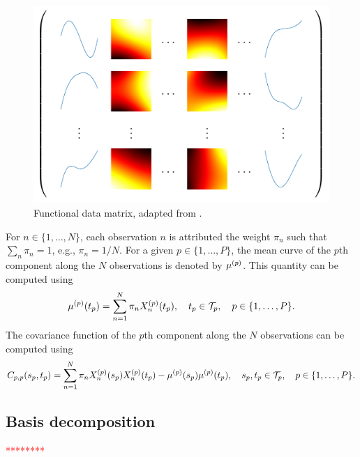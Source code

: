 \begin{figure}
    \centering
    \includegraphics[]{figures/data_matrix.pdf}
    \caption{Functional data matrix, adapted from \cite{berrenderoPrincipalComponentsMultivariate2011}.}
    \label{fig:data_matrix}
\end{figure}

For $n \in \{1, \dots, N\}$, each observation $n$ is attributed the weight $\pi_n$ such that $\sum_n \pi_n = 1$, e.g., $\pi_n = 1/N$.
For a given $p \in \{1, \dots, P\}$, the mean curve of the $p$th component along the $N$ observations is denoted by $\mu^{(p)}$. This quantity can be computed using 
\begin{equation*}\label{eq:mu_estimation}
    \mu^{(p)}(t_p) = \sum_{n = 1}^N \pi_nX_n^{(p)}(t_p), \quad t_p \in \mathcal{T}_{p}, \quad p \in \{1, \dots, P\}.
\end{equation*}
The covariance function of the $p$th component along the $N$ observations can be computed using
\begin{equation}\label{eq:cov_estimation}
    C_{p, p}(s_p, t_p) = \sum_{n = 1}^N \pi_nX_n^{(p)}(s_p)X_n^{(p)}(t_p) - \mu^{(p)}(s_p)\mu^{(p)}(t_p), \quad s_p, t_p \in \mathcal{T}_{p}, \quad p \in \{1, \dots, P\}.
\end{equation}

\subsection{Basis decomposition} %
\label{sub:basis_decomposition}


\textcolor{red}{********}

